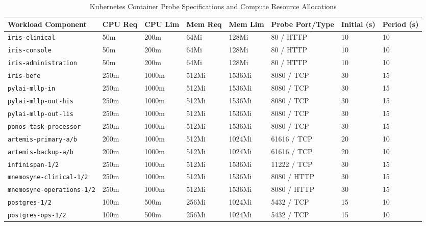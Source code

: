 \begin{table}[htbp]
\centering
\scriptsize
\begin{tabularx}{\textwidth}{l C{1.4cm} C{1.4cm} C{1.4cm} C{1.4cm} C{1.8cm} C{1.6cm} C{1.6cm}}
\toprule
\textbf{Workload Component} & \textbf{CPU Req} & \textbf{CPU Lim} & \textbf{Mem Req} & \textbf{Mem Lim} & \textbf{Probe Port/Type} & \textbf{Initial (s)} & \textbf{Period (s)} \\
\midrule
\texttt{iris-clinical} & 50m & 200m & 64Mi & 128Mi & 80 / HTTP & 10 & 10 \\
\texttt{iris-console} & 50m & 200m & 64Mi & 128Mi & 80 / HTTP & 10 & 10 \\
\texttt{iris-administration} & 50m & 200m & 64Mi & 128Mi & 80 / HTTP & 10 & 10 \\
\texttt{iris-befe} & 250m & 1000m & 512Mi & 1536Mi & 8080 / TCP & 30 & 15 \\
\texttt{pylai-mllp-in} & 250m & 1000m & 512Mi & 1536Mi & 8080 / TCP & 30 & 15 \\
\texttt{pylai-mllp-out-his} & 250m & 1000m & 512Mi & 1536Mi & 8080 / TCP & 30 & 15 \\
\texttt{pylai-mllp-out-lis} & 250m & 1000m & 512Mi & 1536Mi & 8080 / TCP & 30 & 15 \\
\texttt{ponos-task-processor} & 250m & 1000m & 512Mi & 1536Mi & 8080 / TCP & 30 & 15 \\
\texttt{artemis-primary-a/b} & 200m & 1000m & 512Mi & 1024Mi & 61616 / TCP & 20 & 10 \\
\texttt{artemis-backup-a/b} & 200m & 1000m & 512Mi & 1024Mi & 61616 / TCP & 20 & 10 \\
\texttt{infinispan-1/2} & 250m & 1000m & 512Mi & 1536Mi & 11222 / TCP & 30 & 15 \\
\texttt{mnemosyne-clinical-1/2} & 250m & 1000m & 512Mi & 1536Mi & 8080 / HTTP & 30 & 15 \\
\texttt{mnemosyne-operations-1/2} & 250m & 1000m & 512Mi & 1536Mi & 8080 / HTTP & 30 & 15 \\
\texttt{postgres-1/2} & 100m & 500m & 256Mi & 1024Mi & 5432 / TCP & 15 & 10 \\
\texttt{postgres-ops-1/2} & 100m & 500m & 256Mi & 1024Mi & 5432 / TCP & 15 & 10 \\
\bottomrule
\end{tabularx}
\caption{Kubernetes Container Probe Specifications and Compute Resource Allocations}
\label{tab:k8s_probes_resources}
\end{table}

